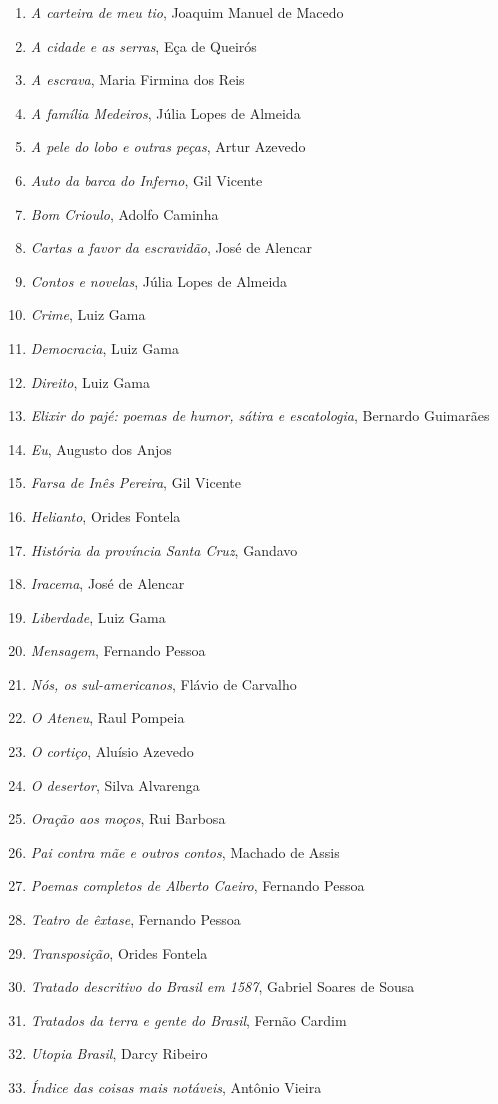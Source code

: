 \begin{enumerate}
\setlength\parskip{4.2pt}
\setlength\itemsep{-1.4mm}
\item \textit{A carteira de meu tio}, Joaquim Manuel de Macedo
\item \textit{A cidade e as serras}, Eça de Queirós
\item \textit{A escrava}, Maria Firmina dos Reis
\item \textit{A família Medeiros}, Júlia Lopes de Almeida 
\item \textit{A pele do lobo e outras peças}, Artur Azevedo
\item \textit{Auto da barca do Inferno}, Gil Vicente
\item \textit{Bom Crioulo}, Adolfo Caminha
\item \textit{Cartas a favor da escravidão}, José de Alencar
\item \textit{Contos e novelas}, Júlia Lopes de Almeida
\item \textit{Crime}, Luiz Gama
\item \textit{Democracia}, Luiz Gama
\item \textit{Direito}, Luiz Gama
\item \textit{Elixir do pajé: poemas de humor, sátira e escatologia}, Bernardo Guimarães
\item \textit{Eu}, Augusto dos Anjos
\item \textit{Farsa de Inês Pereira}, Gil Vicente
\item \textit{Helianto}, Orides Fontela
\item \textit{História da província Santa Cruz}, Gandavo
\item \textit{Iracema}, José de Alencar
\item \textit{Liberdade}, Luiz Gama
\item \textit{Mensagem}, Fernando Pessoa
\item \textit{Nós, os sul-americanos}, Flávio de Carvalho
\item \textit{O Ateneu}, Raul Pompeia
\item \textit{O cortiço}, Aluísio Azevedo
\item \textit{O desertor}, Silva Alvarenga
\item \textit{Oração aos moços}, Rui Barbosa
\item \textit{Pai contra mãe e outros contos}, Machado de Assis
\item \textit{Poemas completos de Alberto Caeiro}, Fernando Pessoa
\item \textit{Teatro de êxtase}, Fernando Pessoa
\item \textit{Transposição}, Orides Fontela
\item \textit{Tratado descritivo do Brasil em 1587}, Gabriel Soares de Sousa
\item \textit{Tratados da terra e gente do Brasil}, Fernão Cardim 
\item \textit{Utopia Brasil}, Darcy Ribeiro
\item \textit{Índice das coisas mais notáveis}, Antônio Vieira
\end{enumerate}

